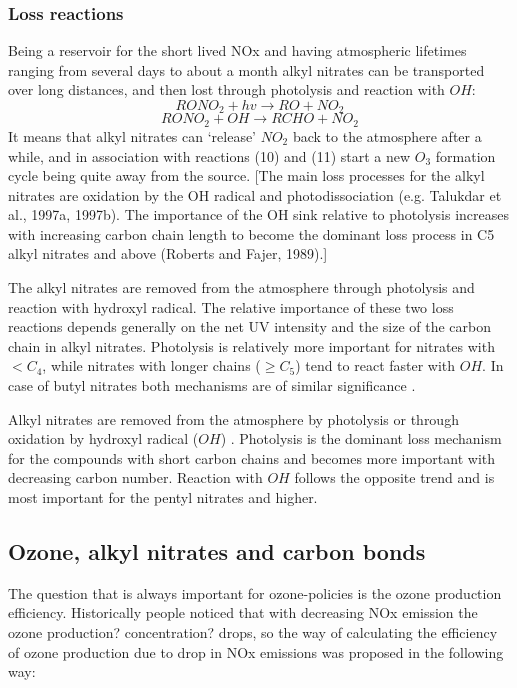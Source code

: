 \documentclass[11pt,a4paper]{article}
\begin{document}
\subsubsection*{Loss reactions}
Being a reservoir for the short lived NOx and having atmospheric lifetimes ranging from several days to about a month \citep{Reeves2007} alkyl nitrates can be transported over long distances, and then lost through photolysis and reaction with $OH$:
\begin{equation} \label{reac:RONO2+hv=RO+NO2}
RONO_2 + hv \rightarrow RO + NO_2
\end{equation}
\begin{equation} \label{reac:RONO2+OH=RCHO+NO2}
RONO_2 + OH \rightarrow RCHO + NO_2
\end{equation}
It means that alkyl nitrates can ‘release’ $NO_2$ back to the atmosphere after a while, and in association with reactions (10) and (11) start a new $O_3$ formation cycle being quite away from the source.
\citep{Newland2013}
[The main loss processes for the alkyl nitrates are oxidation by the OH radical and photodissociation (e.g. Talukdar et al., 1997a, 1997b). The importance of the OH sink relative to photolysis increases with increasing carbon chain length to become the dominant loss process in C5 alkyl nitrates and above (Roberts and Fajer, 1989).]

The alkyl nitrates are removed from the atmosphere through photolysis and reaction with hydroxyl radical.
The relative importance of these two loss reactions depends generally on the net UV intensity and the size of the carbon chain in alkyl nitrates. Photolysis is relatively more important for nitrates with $< C_4$, while nitrates with longer chains ($\geq C_5$) tend to react faster with $OH$. In case of butyl nitrates both mechanisms are of similar significance \citep{Worton2010}.

Alkyl nitrates are removed from the atmosphere by photolysis \citep{Turberg1990} or through oxidation by hydroxyl radical ($OH$) \citep{Talukdar1997}. Photolysis is the dominant loss mechanism for the compounds with short carbon chains and becomes more important with decreasing carbon number. Reaction with $OH$ follows the opposite trend and is most important for the pentyl nitrates and higher.

\subsection{Ozone, alkyl nitrates and carbon bonds}
The question that is always important for ozone-policies is the ozone production efficiency. Historically people noticed that with decreasing NOx emission the ozone production? concentration? drops, so the way of calculating the efficiency of ozone production due to drop in NOx emissions was proposed in the following way:
\end{document}
